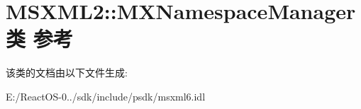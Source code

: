 \hypertarget{class_m_s_x_m_l2_1_1_m_x_namespace_manager}{}\section{M\+S\+X\+M\+L2\+:\+:M\+X\+Namespace\+Manager类 参考}
\label{class_m_s_x_m_l2_1_1_m_x_namespace_manager}


该类的文档由以下文件生成\+:\begin{DoxyCompactItemize}
\item 
E\+:/\+React\+O\+S-\/0../sdk/include/psdk/msxml6.\+idl\end{DoxyCompactItemize}
